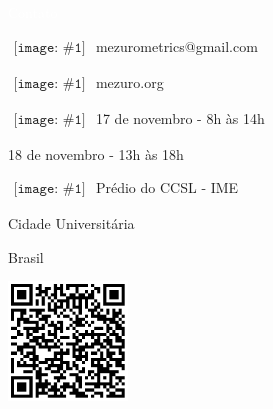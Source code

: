 
\newcommand{\ContactEntry}[2]{
	$\begin{array}{l}
	{\texttt{[image: \#1]}}
	\end{array}
	$ #2
}


\LARGE
\noindent\colorbox{materialGreen}
{\parbox[c][25pt][c]{\textwidth}{\hspace{15pt}\textcolor{white}{Contato}}} %

\begin{multicols}{3}

\large

\ContactEntry{images/green/mail9}{mezurometrics@gmail.com}

\ContactEntry{images/green/links1}{mezuro.org}

\ContactEntry{images/green/black70}{17 de novembro - 8h às 14h

\hspace*{25pt} 18 de novembro - 13h às 18h
}

\columnbreak

\ContactEntry{images/green/house3}{Prédio do CCSL - IME

\hspace*{25pt} Cidade Universitária

\hspace*{25pt} Brasil}

\columnbreak

\hspace*{25pt} \includegraphics[height=90pt]{images/design_sprint_form_qr.png}

\end{multicols}
